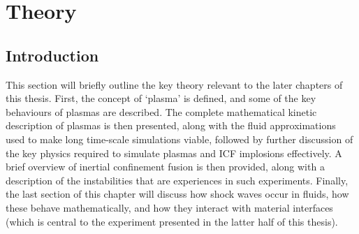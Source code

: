 

\chapter{Theory} \label{ch-theory}

\minitoc

\section{Introduction}
This section will briefly outline the key theory relevant to the later chapters of this thesis. First, the concept of `plasma' is defined, and some of the key behaviours of plasmas are described. The complete mathematical kinetic description of plasmas is then presented, along with the fluid approximations used to make long time-scale simulations viable, followed by further discussion of the key physics required to simulate plasmas and ICF implosions effectively. A brief overview of inertial confinement fusion is then provided, along with a description of the instabilities that are experiences in such experiments. Finally, the last section of this chapter will discuss how shock waves occur in fluids, how these behave mathematically, and how they interact with material interfaces (which is central to the experiment presented in the latter half of this thesis).

